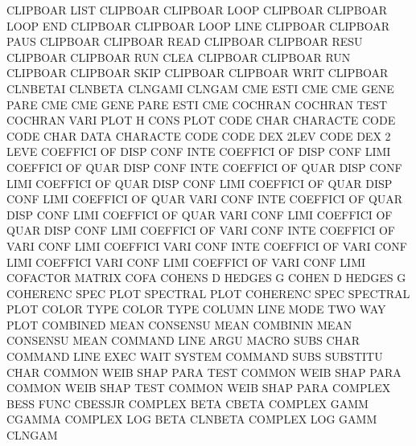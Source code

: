 CLIPBOAR LIST                           CLIPBOAR
CLIPBOAR LOOP                           CLIPBOAR
CLIPBOAR LOOP END                       CLIPBOAR
CLIPBOAR LOOP LINE                      CLIPBOAR
CLIPBOAR PAUS                           CLIPBOAR
CLIPBOAR READ                           CLIPBOAR
CLIPBOAR RESU                           CLIPBOAR
CLIPBOAR RUN  CLEA                      CLIPBOAR
CLIPBOAR RUN                            CLIPBOAR
CLIPBOAR SKIP                           CLIPBOAR
CLIPBOAR WRIT                           CLIPBOAR
CLNBETAI                                CLNBETA
CLNGAMI                                 CLNGAM
CME      ESTI                           CME
CME      GENE PARE                      CME
CME      GENE PARE ESTI                 CME
COCHRAN                                 COCHRAN  TEST
COCHRAN  VARI PLOT                      H        CONS PLOT
CODE     CHAR                           CHARACTE CODE
CODE     CHAR DATA                      CHARACTE CODE
CODE     DEX  2LEV                      CODE     DEX  2    LEVE
COEFFICI OF   DISP CONF INTE            COEFFICI OF   DISP CONF LIMI
COEFFICI OF   QUAR DISP CONF INTE       COEFFICI OF   QUAR DISP CONF LIMI
COEFFICI OF   QUAR DISP CONF LIMI       COEFFICI OF   QUAR DISP CONF LIMI
COEFFICI OF   QUAR VARI CONF INTE       COEFFICI OF   QUAR DISP CONF LIMI
COEFFICI OF   QUAR VARI CONF LIMI       COEFFICI OF   QUAR DISP CONF LIMI
COEFFICI OF   VARI CONF INTE            COEFFICI OF   VARI CONF LIMI
COEFFICI VARI CONF INTE                 COEFFICI OF   VARI CONF LIMI
COEFFICI VARI CONF LIMI                 COEFFICI OF   VARI CONF LIMI
COFACTOR                                MATRIX   COFA
COHENS   D                              HEDGES   G
COHEN    D                              HEDGES   G
COHERENC SPEC PLOT                      SPECTRAL PLOT
COHERENC SPEC                           SPECTRAL PLOT
COLOR    TYPE                           COLOR    TYPE
COLUMN   LINE MODE                      TWO      WAY  PLOT
COMBINED MEAN                           CONSENSU MEAN
COMBININ MEAN                           CONSENSU MEAN
COMMAND  LINE ARGU                      MACRO    SUBS CHAR
COMMAND  LINE EXEC WAIT                 SYSTEM
COMMAND  SUBS                           SUBSTITU CHAR
COMMON   WEIB SHAP PARA TEST            COMMON   WEIB SHAP PARA
COMMON   WEIB SHAP TEST                 COMMON   WEIB SHAP PARA
COMPLEX  BESS FUNC                      CBESSJR
COMPLEX  BETA                           CBETA
COMPLEX  GAMM                           CGAMMA
COMPLEX  LOG BETA                       CLNBETA
COMPLEX  LOG GAMM                       CLNGAM
